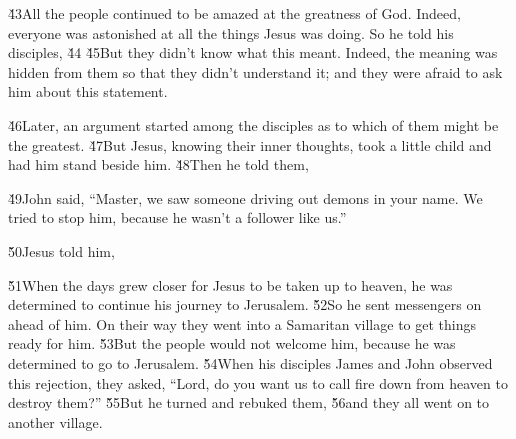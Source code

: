 \v{43}All the people continued to be amazed at the greatness of God. Indeed, everyone was astonished at all the things Jesus was doing. So he told his disciples, \v{44} \v{45}But they didn't know what this meant. Indeed, the meaning was hidden from them so that they didn't understand it; and they were afraid to ask him about this statement.

\v{46}Later, an argument started among the disciples as to which of them might be the greatest. \v{47}But Jesus, knowing their inner thoughts, took a little child and had him stand beside him. \v{48}Then he told them, 

\v{49}John said, ``Master, we saw someone driving out demons in your name. We tried to stop him, because he wasn't a follower like us.''

\v{50}Jesus told him, 

\v{51}When the days grew closer for Jesus to be taken up to heaven, he was determined to continue his journey to Jerusalem. \v{52}So he sent messengers on ahead of him. On their way they went into a Samaritan village to get things ready for him. \v{53}But the people would not welcome him, because he was determined to go to Jerusalem. \v{54}When his disciples James and John observed this rejection, they asked, ``Lord, do you want us to call fire down from heaven to destroy them?'' \v{55}But he turned and rebuked them, \v{56}and they all went on to another village.

